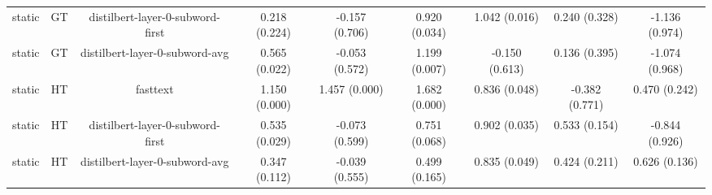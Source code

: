 \begin{sidewaystable}[htb]
\begin{tabular}{@{}ccccccccc@{}}
        static & GT & distilbert-layer-0-subword-first & 0.218 (0.224) & -0.157 (0.706) & 0.920 (0.034) & 1.042 (0.016) & 0.240 (0.328) & -1.136 (0.974) \\
        static & GT & distilbert-layer-0-subword-avg & 0.565 (0.022) & -0.053 (0.572) & 1.199 (0.007) & -0.150 (0.613) & 0.136 (0.395) & -1.074 (0.968) \\
        static & HT & fasttext & 1.150 (0.000) & 1.457 (0.000) & 1.682 (0.000) & 0.836 (0.048) & -0.382 (0.771) & 0.470 (0.242) \\
        static & HT & distilbert-layer-0-subword-first & 0.535 (0.029) & -0.073 (0.599) & 0.751 (0.068) & 0.902 (0.035) & 0.533 (0.154) & -0.844 (0.926) \\
        static & HT & distilbert-layer-0-subword-avg & 0.347 (0.112) & -0.039 (0.555) & 0.499 (0.165) & 0.835 (0.049) & 0.424 (0.211) & 0.626 (0.136) \\
        \bottomrule
    \end{tabular}
\end{sidewaystable}